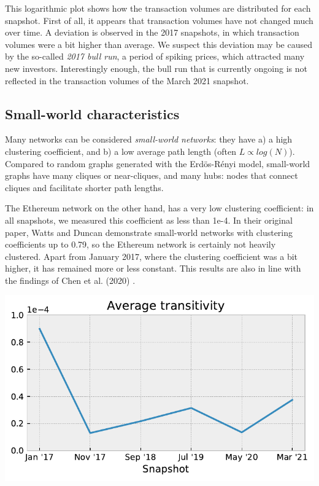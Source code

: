 \documentclass[10pt,a4paper]{article}
\newenvironment{Figure}
  {\par\medskip\noindent\minipage{\linewidth}}
  {\endminipage\par\medskip}
\begin{document}
\begin{multicols}{2}
This logarithmic plot shows how the transaction volumes are distributed for each snapshot. First of all, it appears that transaction volumes have not changed much over time. A deviation is observed in the 2017 snapshots, in which transaction volumes were a bit higher than average. We suspect this deviation may be caused by the so-called \textit{2017 bull run}, a period of spiking prices, which attracted many new investors. Interestingly enough, the bull run that is currently ongoing is not reflected in the transaction volumes of the March 2021 snapshot.

\subsection{Small-world characteristics}
Many networks can be considered \textit{small-world networks}: they have a) a high clustering coefficient, and b) a low average path length \cite{WattsDuncanJ1998Cdos} (often $L \propto log(N)$). Compared to random graphs generated with the Erd\"{o}s-R\'{e}nyi model, small-world graphs have many cliques or near-cliques, and many hubs: nodes that connect cliques and facilitate shorter path lengths.

The Ethereum network on the other hand, has a very low clustering coefficient: in all snapshots, we measured this coefficient as less than 1e-4. In their original paper, Watts and Duncan demonstrate small-world networks with clustering coefficients up to 0.79, so the Ethereum network is certainly not heavily clustered. Apart from January 2017, where the clustering coefficient was a bit higher, it has remained more or less constant. This results are also in line with the findings of  Chen et al. (2020) \cite{chenEthereum}. 

\begin{Figure}
\centering
\includegraphics[scale=0.55]{figures/transitivity.pdf}
\end{Figure}


\end{multicols}
\end{document}
